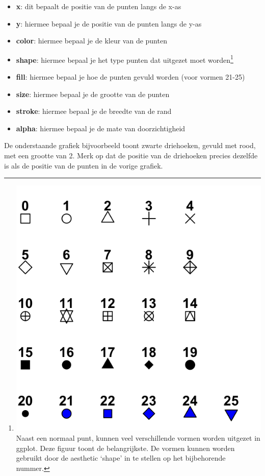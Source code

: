 \documentclass[]{tufte-book}
\providecommand{\tightlist}{%
  \setlength{\itemsep}{0pt}\setlength{\parskip}{0pt}}
\begin{document}
\begin{itemize}
\tightlist
\item
  \textbf{x}: dit bepaalt de positie van de punten langs de x-as
\item
  \textbf{y}: hiermee bepaal je de positie van de punten langs de y-as
\item
  \textbf{color}: hiermee bepaal je de kleur van de punten
\item
  \textbf{shape}: hiermee bepaal je het type punten dat uitgezet moet worden\footnote{\includegraphics{images/points-symbols.png} Naast een normaal punt, kunnen veel verschillende vormen worden uitgezet in ggplot. Deze figuur toont de belangrijkste. De vormen kunnen worden gebruikt door de aesthetic `shape' in te stellen op het bijbehorende nummer.}
\item
  \textbf{fill}: hiermee bepaal je hoe de punten gevuld worden (voor vormen 21-25)
\item
  \textbf{size}: hiermee bepaal je de grootte van de punten
\item
  \textbf{stroke}: hiermee bepaal je de breedte van de rand
\item
  \textbf{alpha}: hiermee bepaal je de mate van doorzichtigheid
\end{itemize}

De onderstaande grafiek bijvoorbeeld toont zwarte driehoeken, gevuld met rood, met een grootte van 2. Merk op dat de positie van de driehoeken precies dezelfde is als de positie van de punten in de vorige grafiek.
\end{document}
